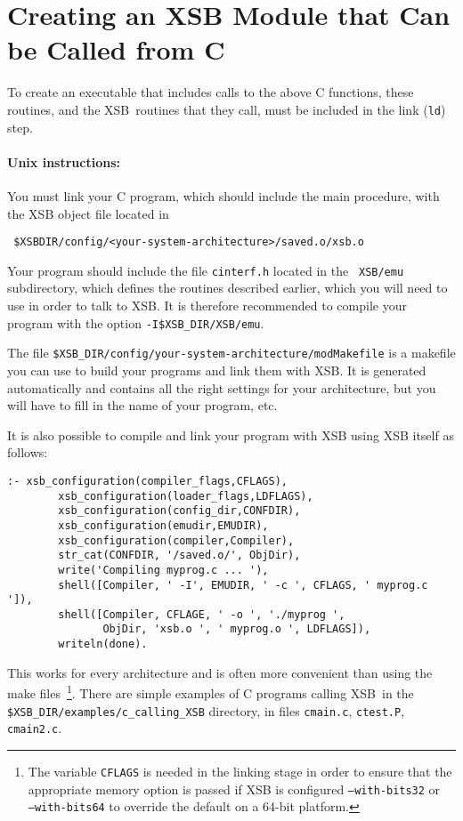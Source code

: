 \section{Creating an XSB Module that Can be Called from C}

To create an executable that includes calls to the above C functions,
these routines, and the XSB\ routines that they call, must be
included in the link ({\tt ld}) step.

\paragraph{Unix instructions:}
You must link your C program, which should include the main procedure, with
the XSB object file located in
\begin{verbatim}
 $XSBDIR/config/<your-system-architecture>/saved.o/xsb.o  
\end{verbatim}
Your program should include the file {\tt cinterf.h} located in the {\tt
  XSB/emu} subdirectory, which defines the routines described earlier,
which you will need to use in order to talk to XSB.  It is therefore
recommended to compile your program with the option
\verb|-I$XSB_DIR/XSB/emu|.

The file {\tt \$XSB\_DIR/config/your-system-architecture/modMakefile} is a
makefile you can use to build your programs and link them with XSB.  It is
generated automatically and contains all the right settings for your
architecture, but you will have to fill in the name of your program, etc.

It is also possible to compile and link your program with XSB using XSB
itself as follows:
\begin{verbatim}
:- xsb_configuration(compiler_flags,CFLAGS),
        xsb_configuration(loader_flags,LDFLAGS),
        xsb_configuration(config_dir,CONFDIR),
        xsb_configuration(emudir,EMUDIR),
        xsb_configuration(compiler,Compiler),
        str_cat(CONFDIR, '/saved.o/', ObjDir),
        write('Compiling myprog.c ... '),
        shell([Compiler, ' -I', EMUDIR, ' -c ', CFLAGS, ' myprog.c ']),
        shell([Compiler, CFLAGE, ' -o ', './myprog ',
               ObjDir, 'xsb.o ', ' myprog.o ', LDFLAGS]),
        writeln(done).  
\end{verbatim}
This works for every architecture and is often more convenient than
using the make files~\footnote{The variable {\tt CFLAGS} is needed in
  the linking stage in order to ensure that the appropriate memory
  option is passed if XSB is configured {\tt --with-bits32} or {\tt
    --with-bits64} to override the default on a 64-bit platform.}.
There are simple examples of C programs calling XSB\ in the
{\tt \$XSB\_DIR/examples/c\_calling\_XSB} directory, in files {\tt cmain.c},
{\tt ctest.P}, {\tt cmain2.c}.

